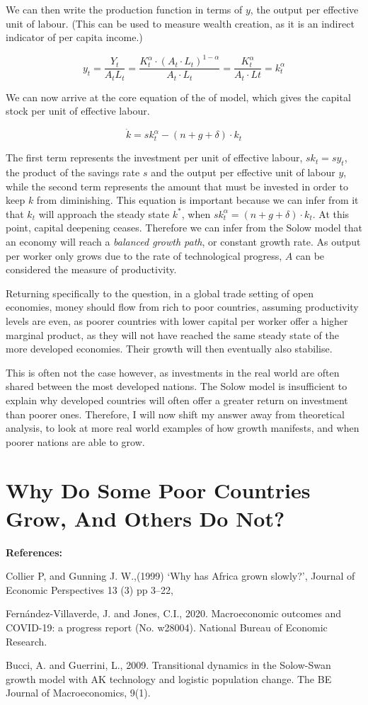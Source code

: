 \documentclass[12pt]{article}
\begin{document}
We can then write the production function in terms of $y$, the output per effective 
unit of labour. (This can be used to measure wealth creation, as it is an indirect 
indicator of per capita income.) 

\[y_{t} = \frac{Y_{t}}{A_{t}L_{t}} = \frac{K_{t}^{\alpha} \cdot (A_{t} \cdot L_{t})^{1-\alpha}}{A_{t} \cdot L_{t}} = \frac{K_{t}^{\alpha}}{A_{t} \cdot L{t}} = k_{t}^{\alpha}\]

We can now arrive at the core equation of the of model, which gives the capital stock per unit 
of effective labour.

\[ \dot{k} = sk_{t}^{\alpha} - (n + g + \delta) \cdot k_{t} \]

The first term represents the investment per unit of effective labour, \(sk_{t} = sy_{t}\), the 
product of the savings rate $s$ and the output per effective unit of labour $y$, while the second 
term represents the amount that must be invested in order to keep $k$ from diminishing. This 
equation is important because we can infer from it that $k_{t}$ will approach the steady state 
$k^{*}$, when \(sk_{t}^{\alpha} = (n + g + \delta) \cdot k_{t}\). At this point, capital deepening 
ceases. Therefore we can infer from the Solow model that an economy will reach a \textit{balanced 
growth path}, or constant growth rate. As output per worker only grows due to the rate of 
technological progress, $A$ can be considered the measure of productivity. 

Returning specifically to the question, in a global trade setting of open economies, money 
should flow from rich to poor countries, assuming productivity levels are even, as poorer countries 
with lower capital per worker offer a higher marginal product, as they will not have reached the 
same steady state of the more developed economies. Their growth will then eventually also 
stabilise. 
\newline

This is often not the case however, as investments in the real world are often shared between 
the most developed nations. The Solow model is insufficient to explain why developed countries 
will often offer a greater return on investment than poorer ones. Therefore, I will now shift my 
answer away from theoretical analysis, to look at more real world examples of how growth manifests, 
and when poorer nations are able to grow. 
\newline

\section{Why Do Some Poor Countries Grow, And Others Do Not?}

\pagebreak
\textbf{References:}

Collier P, and Gunning J. W.,(1999) ‘Why has Africa grown slowly?’, Journal of Economic Perspectives 13 (3) pp 3–22,

Fernández-Villaverde, J. and Jones, C.I., 2020. Macroeconomic outcomes and COVID-19: a progress report (No. w28004). National Bureau of Economic Research.

Bucci, A. and Guerrini, L., 2009. Transitional dynamics in the Solow-Swan growth model with AK technology and logistic population change. The BE Journal of Macroeconomics, 9(1).
\end{document}
